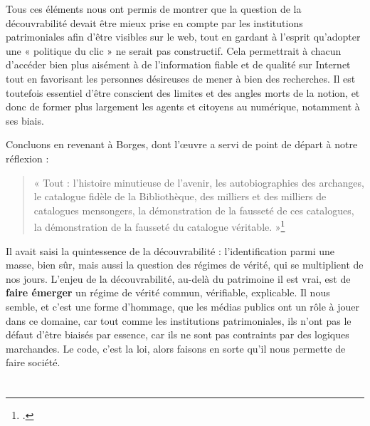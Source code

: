 \documentclass[a4paper,12pt,twoside]{book}
\begin{document}
	Tous ces éléments nous ont permis de montrer que la question de la découvrabilité devait être mieux prise en compte par les institutions patrimoniales afin d'être visibles sur le web, tout en gardant à l'esprit qu'adopter une « politique du clic » ne serait pas constructif. Cela permettrait à chacun d'accéder bien plus aisément à de l'information fiable et de qualité sur Internet tout en favorisant les personnes désireuses de mener à bien des recherches. Il est toutefois essentiel d'être conscient des limites et des angles morts de la notion, et donc de former plus largement les agents et citoyens au numérique, notamment à ses biais.
	
	Concluons en revenant à Borges, dont l'œuvre a servi de point de départ à notre réflexion :
	
	\begin{quote}
		« Tout : l’histoire minutieuse de l’avenir, les autobiographies des archanges, le catalogue fidèle de la Bibliothèque, des milliers et des milliers de catalogues mensongers, la démonstration de la fausseté de ces catalogues, la démonstration de la fausseté du catalogue véritable. »\footcite[p. 3]{borges1963}
	\end{quote}
	
	Il avait saisi la quintessence de la découvrabilité : l'identification parmi une masse, bien sûr, mais aussi la question des régimes de vérité, qui se multiplient de nos jours. L'enjeu de la découvrabilité, au-delà du patrimoine il est vrai, est de \textbf{faire émerger} un régime de vérité commun, vérifiable, explicable. Il nous semble, et c'est une forme d'hommage, que les médias publics ont un rôle à jouer dans ce domaine, car tout comme les institutions patrimoniales, ils n'ont pas le défaut d'être biaisés par essence, car ils ne sont pas contraints par des logiques marchandes. Le code, c'est la loi, alors faisons en sorte qu'il nous permette de faire société.
	
	\newpage{\pagestyle{empty}\cleardoublepage}
	
	\renewcommand\indexname{Index thématique (grandes notions)} %
	
	
	
	
	
	
	\appendix %
	
	\chapter[Supports conservés]{}
	
\end{document}
